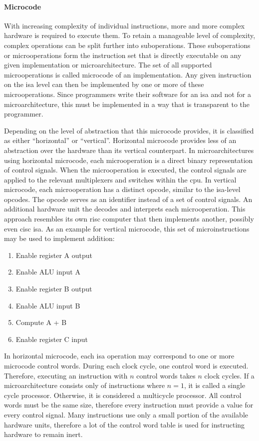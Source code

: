 \paragraph*{Microcode}

With increasing complexity of individual instructions, more and more complex hardware is required to execute them. To retain a manageable level of complexity, complex operations can be split further into suboperations. These suboperations or microoperations form the instruction set that is directly executable on any given implementation or microarchitecture. The set of all supported microoperations is called microcode of an implementation. Any given instruction on the \ac{isa} level can then be implemented by one or more of these microoperations. Since programmers write their software for an \ac{isa} and not for a microarchitecture, this must be implemented in a way that is transparent to the programmer.

Depending on the level of abstraction that this microcode provides, it is classified as either ``horizontal'' or ``vertical''. Horizontal microcode provides less of an abstraction over the hardware than its vertical counterpart. In microarchitectures using horizontal microcode, each microoperation is a direct binary representation of control signals. When the microoperation is executed, the control signals are applied to the relevant multiplexers and switches within the \ac{cpu}. In vertical microcode, each microoperation has a distinct opcode, similar to the \ac{isa}-level opcodes. The opcode serves as an identifier instead of a set of control signals. An additional hardware unit the decodes and interprets each microoperation. This approach resembles its own \ac{risc} computer that then implements another, possibly even \ac{cisc} \ac{isa}. As an example for vertical microcode, this set of microinstructions may be used to implement addition:

\newpage
\begin{enumerate}
    \item Enable register A output
    \item Enable ALU input A
    \item Enable register B output
    \item Enable ALU input B
    \item Compute A + B
    \item Enable register C input
\end{enumerate}

In horizontal microcode, each \ac{isa} operation may correspond to one or more microcode control words. During each clock cycle, one control word is executed. Therefore, executing an instruction with $n$ control words takes $n$ clock cycles. If a microarchitecture consists only of instructions where $n = 1$, it is called a single cycle processor. Otherwise, it is considered a multicycle processor. All control words must be the same size, therefore every instruction must provide a value for every control signal. Many instructions use only a small portion of the available hardware units, therefore a lot of the control word table is used for instructing hardware to remain inert.

